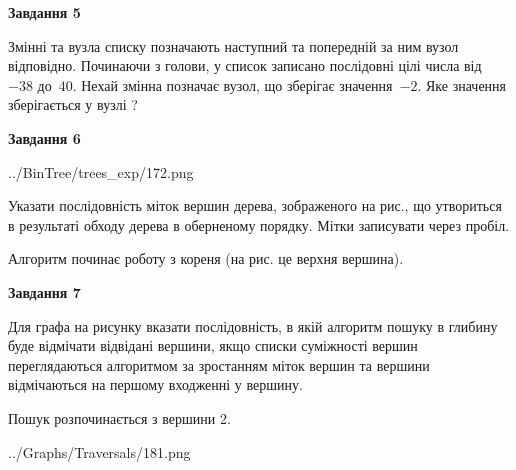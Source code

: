 \documentclass[12pt, ukrainian]{article}
\begin{document}
{\begin {large}
{\begin {center}\textbf{Завдання 5}\end {center}}\par
Змінні  та  вузла списку позначають наступний та попередній за ним вузол відповідно. Починаючи з голови, у список записано послідовні цілі числа від~$-38$ до~$40$. Нехай змінна  позначає вузол, що зберігає значення~$-2$.
Яке значення зберігається у вузлі  ?\par
\newpage

{\begin {center}\textbf{Завдання 6}\end {center}}\par

\begin{center}
	{../BinTree/trees_exp/172.png}
\end{center}
Указати послідовність міток вершин дерева, зображеного на рис., що утвориться в результаті обходу дерева в оберненому порядку. Мітки записувати через пробіл.\par Алгоритм починає роботу з кореня (на рис. це верхня вершина).\par
\newpage

{\begin {center}\textbf{Завдання 7}\end {center}}\par
Для графа на рисунку вказати послідовність, в якій алгоритм пошуку в глибину буде відмічати відвідані вершини, якщо списки суміжності вершин переглядаються алгоритмом за зростанням міток вершин та вершини відмічаються на першому вход\-женні у вершину.\par
Пошук розпочинається з вершини 2.\par

\begin{center}
	{../Graphs/Traversals/181.png}
\end{center}\par
\newpage


\end{large}}
\end{document}

